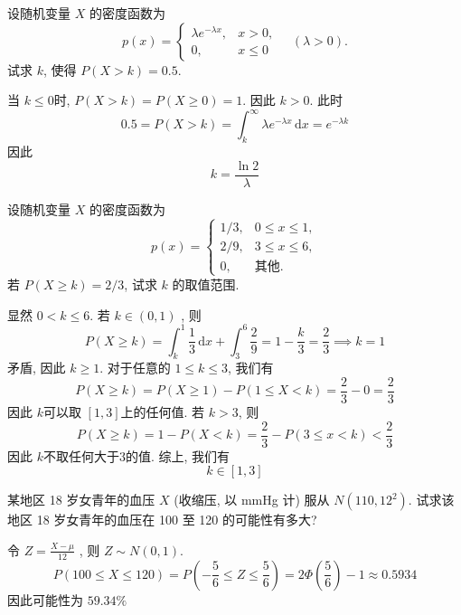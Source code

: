 \documentclass[../main.tex]{subfiles}
\begin{document}
\begin{exercise}{}{}
设随机变量 $X$ 的密度函数为
\[
p(x) = \begin{cases}
\lambda e^{-\lambda x}, & x > 0, \\
0, & x \leqslant 0
\end{cases}
\quad (\lambda > 0).
\]
试求 $k$, 使得 $P(X > k) = 0.5$.
\end{exercise}

\begin{solution}
     当 \(  k\le 0  \)时, \(  P\left( X> k \right)= P\left( X\ge 0 \right)= 1    \). 因此 \(  k> 0  \). 此时 \[
    0.5= P\left( X> k \right)= \int_{k}^{\infty} \lambda e^{- \lambda x}\,\mathrm{d} x= e^{- \lambda k} 
    \]因此 \[
    k= \frac{\ln 2 }{ \lambda  } 
    \]   
\end{solution}

\begin{exercise}{}{}
设随机变量 $X$ 的密度函数为
\[
p(x) = \begin{cases}
1/3, & 0 \leqslant x \leqslant 1, \\
2/9, & 3 \leqslant x \leqslant 6, \\
0, & \text{其他}.
\end{cases}
\]
若 $P(X \geqslant k) = 2/3$, 试求 $k$ 的取值范围.
\end{exercise}
\begin{solution}
    显然 \( 0< k\le 6  \). 若 \(  k\in \left( 0,1\right) \) , 则 \[
    P\left( X\ge k \right)= \int_{k}^{1}\frac{1 }{3 }\,\mathrm{d} x+ \int_{3}^{6}\frac{2 }{9 }= 1-\frac{k }{3 }= \frac{2 }{3 }\implies k= 1     
    \]矛盾, 因此 \(  k\ge  1  \). 
    对于任意的 \(  1\le k\le 3  \), 我们有 \[
    P\left( X\ge k \right)= P\left( X\ge 1 \right)-P\left( 1\le X< k \right)= \frac{2 }{3 }-0= \frac{2 }{3 }    
    \]因此 \(  k  \)可以取 \(  \left[ 1,3 \right]   \)上的任何值.
    若 \(  k> 3  \), 则 \[
    P\left( X\ge k \right)= 1-P\left( X< k \right)= \frac{2 }{3 }-P\left( 3\le x< k \right)     < \frac{2 }{3 } 
    \]因此 \(  k  \)不取任何大于3的值. 综上, 我们有 \[
    k\in \left[ 1,3 \right] 
    \]     
\end{solution}

\begin{exercise}{}{}
某地区 18 岁女青年的血压 $X$ (收缩压, 以 mmHg 计) 服从 $N(110, 12^2)$. 试求该地区 18 岁女青年的血压在 100 至 120 的可能性有多大?
\end{exercise}

\begin{solution}
令 \(  Z= \frac{X-\mu  }{12 }   \) , 则  \(  Z\sim N\left( 0,1 \right).   \) \[
P\left( 100\le X\le 120 \right)= P\left(-\frac{5 }{6 }\le Z\le \frac{5 }{6 }    \right)  = 2\Phi \left( \frac{5 }{6 }  \right)-1 \approx 0.5934
\]因此可能性为 \(  59.34\%  \) 
\end{solution}
\end{document}

